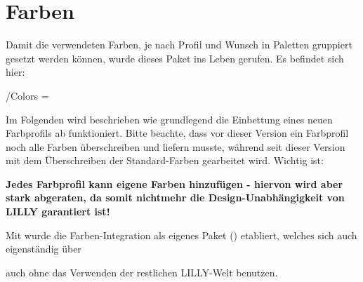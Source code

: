 \chapter[Farben \LILLYxBOXxVersion{\small 1.0.4}]{Farben}
Damit die verwendeten Farben, je nach Profil und Wunsch in Paletten gruppiert gesetzt werden können, wurde dieses Paket ins Leben gerufen. Es befindet sich hier:\begin{center}
    /Colors = 
\end{center}
Im Folgenden wird beschrieben wie grundlegend die Einbettung eines neuen Farbprofils ab  funktioniert. Bitte beachte, dass vor dieser Version ein Farbprofil noch alle Farben überschreiben und liefern musste, während seit dieser Version mit dem Überschreiben der Standard-Farben gearbeitet wird. Wichtig ist:\begin{center}
    \small\bfseries Jedes Farbprofil kann eigene Farben hinzufügen - hiervon wird aber stark abgeraten, da somit nichtmehr die Design-Unabhängigkeit von LILLY garantiert ist!
\end{center}
\begin{bemerkung}
    Mit  wurde die Farben-Integration als eigenes Paket () etabliert, welches sich auch eigenständig über \begin{latex}
\usepackage{LILLYxCOLOR}
        \end{latex}
        auch ohne das Verwenden der restlichen LILLY-Welt benutzen.
\end{bemerkung}
